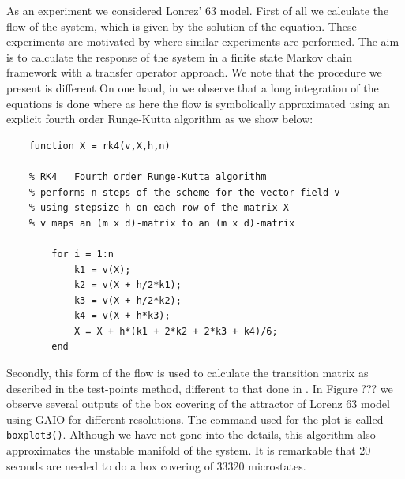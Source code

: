 As an experiment we considered Lonrez' 63 model. First of all we calculate the flow of the system, which is given by the solution of the equation. These experiments are motivated by \cite{lucarini} where similar experiments are performed. The aim is to calculate the response of the system in a finite state Markov chain framework with a transfer operator approach. We note that the procedure we present is different  On one hand, in \cite{lucarini} we observe that a long integration of the equations is done where as here the flow is symbolically approximated using an explicit fourth order Runge-Kutta algorithm as we show below:

\begin{verbatim}
	function X = rk4(v,X,h,n)
	
	% RK4   Fourth order Runge-Kutta algorithm 
	% performs n steps of the scheme for the vector field v
	% using stepsize h on each row of the matrix X
	% v maps an (m x d)-matrix to an (m x d)-matrix 
	
	    for i = 1:n
	        k1 = v(X);
	        k2 = v(X + h/2*k1);
	        k3 = v(X + h/2*k2);
	        k4 = v(X + h*k3);
	        X = X + h*(k1 + 2*k2 + 2*k3 + k4)/6;
	    end
\end{verbatim}
Secondly, this form of the flow is used to calculate the transition matrix as described in the test-points method, different to that done in \cite{lucarini}. In Figure ??? we observe several outputs of the box covering of the attractor of Lorenz 63 model using GAIO for different resolutions. The command used for the plot is called \texttt{boxplot3()}. Although we have not gone into the details, this algorithm also approximates the unstable manifold of the system. It is remarkable that 20 seconds are needed to do a box covering of 33320 microstates.  

